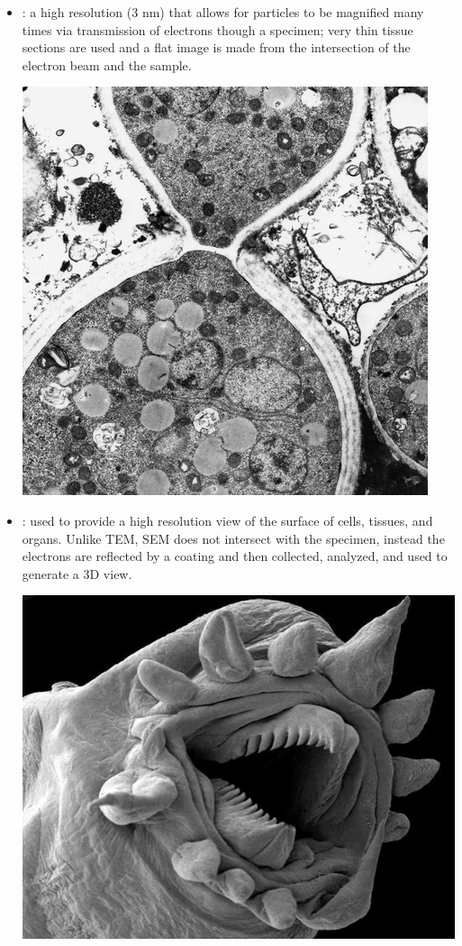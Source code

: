 \begin{itemize}
\begin{center}
  \end{center}
  \newpage
  \item {}: a high resolution (3 nm) that allows for particles to be magnified many times via transmission of electrons though a specimen; very thin tissue sections are used and a flat image is made from the intersection of the electron beam and the sample.
  \begin{center}
    \includegraphics[scale=0.60]{images/week-1-1g.png}
  \end{center}
  \item {}: used to provide a high resolution view of the surface of cells, tissues, and organs. Unlike TEM, SEM does not intersect with the specimen, instead the electrons are reflected by a coating and then collected, analyzed, and used to generate a 3D view.
  \begin{center}
    \includegraphics[scale=0.60]{images/week-1-1f.png}
  \end{center}
\end{itemize}
\clearpage
